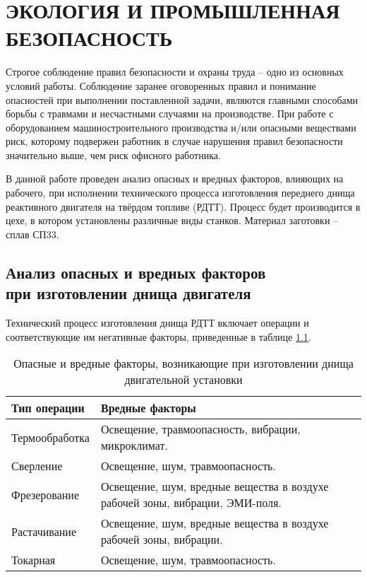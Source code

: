 \chapter{ЭКОЛОГИЯ И ПРОМЫШЛЕННАЯ \\БЕЗОПАСНОСТЬ}
\label{cha:ch_4}

Строгое соблюдение правил безопасности и охраны труда – одно из основных условий работы. Соблюдение заранее оговоренных правил и понимание опасностей при выполнении поставленной задачи, являются главными способами борьбы с травмами и несчастными случаями на производстве. При работе с оборудованием машиностроительного производства и/или опасными веществами риск, которому подвержен работник в случае нарушения правил безопасности значительно выше, чем риск офисного работника.

В данной работе проведен анализ опасных и вредных факторов, влияющих на рабочего, при исполнении технического процесса изготовления переднего днища реактивного двигателя на твёрдом топливе (РДТТ). Процесс будет производится в цехе, в котором установлены различные виды станков. Материал заготовки – сплав СП33.

\section{Анализ опасных и вредных факторов \\ при изготовлении днища двигателя}
Технический процесс изготовления днища РДТТ включает операции и соответствующие им негативные факторы, приведенные в таблице \ref{tab:all_bad_factors}.

\begin{table}[!h]
	\begin{center}
		\caption{Опасные и вредные факторы, возникающие при изготовлении днища двигательной установки}
		\begin{tabular}{|l|p{110mm}|}
  		\hline
Тип операции & Вредные факторы \\ \hline 
Термообработка & Освещение, травмоопасность, вибрации, микроклимат. \\ \hline 
Сверление & Освещение, шум, травмоопасность. \\ \hline 
Фрезерование & Освещение, шум, вредные вещества в воздухе рабочей зоны, вибрации, ЭМИ-поля. \\ \hline 
Растачивание & Освещение, шум, вредные вещества в воздухе рабочей зоны, вибрации. \\ \hline 
Токарная & Освещение, шум, травмоопасность. \\ \hline 
		\end{tabular}
		\label{tab:all_bad_factors}
	\end{center}
\end{table}

